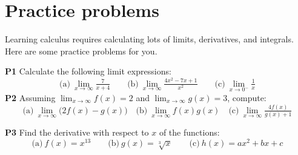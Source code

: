 \documentclass[10pt]{IEEEtran}
\begin{document}

% 




















%
%




\bigskip
\section{Practice problems}

	Learning calculus requires calculating lots of limits, derivatives, and integrals.
	Here are some practice problems for you.

	\noindent
	\textbf{P1}	
		Calculate the following limit expressions:
		\[
			\text{(a)}~\lim_{x\to \infty} \tfrac{7}{x+4}
			\qquad
			\text{(b)}~\lim_{x\to\infty}\tfrac{4x^2-7x+1}{x^2}
			\qquad
			\text{(c)}~\lim_{x\to 0^-} \tfrac{1}{x}
		\]
	\noindent
	\textbf{P2}	
		Assuming $\displaystyle\lim_{x\to\infty} f(x)= 2$ and $\displaystyle\lim_{x\to\infty} g(x)=3$,
		compute:
		\[
			\text{(a)}~\!\!\lim_{x\to\infty}\bigl(2f(x)-g(x)\bigr)
			\quad
			\text{(b)}~\!\!\lim_{x\to\infty} f(x)g(x)
			\quad
			\text{(c)}~\!\!\lim_{x\to\infty}\tfrac{4f(x)}{g(x)+1}
		\]

	\noindent
	\textbf{P3}	
		Find the derivative with respect to $x$ of the functions:
		\[
			\text{(a)}~f(x) = x^{13}
			\qquad
			\text{(b)}~g(x) = \sqrt[3]{x}
			\qquad
			\text{(c)}~h(x) =  ax^2 + bx + c
		\]
\end{document}

